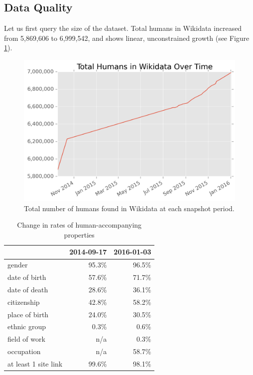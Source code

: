 \documentclass[letterpaper]{article}
\begin{document}
\subsection{Data Quality}
Let us first query the size of the dataset. Total humans in Wikidata increased from 5,869,606 to 6,999,542, and shows linear, unconstrained growth (see Figure \ref{fig:totalhumans}).
\begin{figure}
\label{fig:totalhumans}
\includegraphics[scale=0.6]{figures/totalhumans.png} 
\caption{Total number of humans found in Wikidata at each snapshot period.}
\end{figure}

\begin{table}
\caption{Change in rates of human-accompanying properties}
\begin{tabular}{lrr}
\toprule
{} &  2014-09-17 &  2016-01-03 \\
\midrule
gender               &       95.3\% &       96.5\% \\
date of birth        &       57.6\% &       71.7\% \\
date of death        &       28.6\% &       36.1\% \\
citizenship          &       42.8\% &       58.2\% \\
place of birth       &       24.0\% &       30.5\% \\
ethnic group         &        0.3\% &        0.6\% \\
field of work        &        n/a &        0.3\% \\
occupation           &        n/a &       58.7\% \\
at least 1 site link &       99.6\% &       98.1\% \\
\bottomrule
\end{tabular}
\label{table:accompanying}
\end{table}
\end{document}
